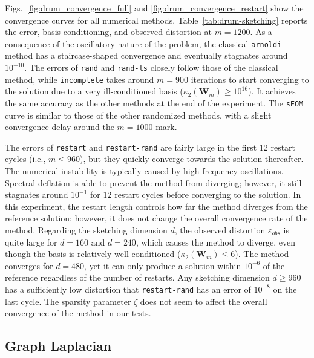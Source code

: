 \documentclass[smallextended]{svjour3}
\newcommand{\mat}[1]{\mathbf{#1}}
\begin{document}
Figs.~\ref{fig:drum_convergence_full} and \ref{fig:drum_convergence_restart} show the convergence curves for all numerical methods. Table~\ref{tab:drum-sketching} reports the error, basis conditioning, and observed distortion at $m = 1200$. As a consequence of the oscillatory nature of the problem, the classical \texttt{arnoldi} method has a staircase-shaped convergence and eventually stagnates around $10^{-10}$. The errors of \texttt{rand} and \texttt{rand-ls} closely follow those of the classical method, while \texttt{incomplete} takes around $m = 900$ iterations to start converging to the solution due to a very ill-conditioned basis ($\kappa_2(\mat{W}_m) \geq 10^{16}$). It achieves the same accuracy as the other methods at the end of the experiment. The \texttt{sFOM} curve is similar to those of the other randomized methods, with a slight convergence delay around the $m = 1000$ mark.

The errors of \texttt{restart} and \texttt{restart-rand} are fairly large in the first $12$ restart cycles (i.e., $m \leq 960$), but they quickly converge towards the solution thereafter. The numerical instability is typically caused by high-frequency oscillations. Spectral deflation is able to prevent the method from diverging; however, it still stagnates around $10^{-1}$ for $12$ restart cycles before converging to the solution. In this experiment, the restart length controls how far the method diverges from the reference solution; however, it does not change the overall convergence rate of the method.
Regarding the sketching dimension $d$, the observed distortion $\varepsilon_{obs}$ is quite large for $d = 160$ and $d = 240$, which causes the method to diverge, even though the basis is relatively well conditioned ($\kappa_2(\mat{W}_m) \leq 6$). The method converges for $d = 480$, yet it can only produce a solution within $10^{-6}$ of the reference regardless of the number of restarts. Any sketching dimension $d \geq 960$ has a sufficiently low distortion that \texttt{restart-rand} has an error of $10^{-8}$ on the last cycle. The sparsity parameter $\zeta$ does not seem to affect the overall convergence of the method in our tests.



\subsection{Graph Laplacian}
\label{subsec:laplacian}
\end{document}
